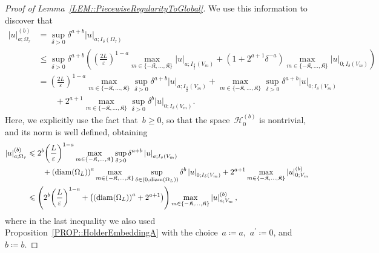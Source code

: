 \documentclass[12pt,a4paper]{amsart}
\makeatletter
\numberwithin{equation}{section}
\theoremstyle{definition}
\theoremstyle{remark}
\newcommand{\eps}{\varepsilon}
\newcommand{\abs}[1]{\left\lvert#1\right\rvert}
\renewcommand{\leq}{\leqslant}
\renewcommand{\geq}{\geqslant}
\newcommand{\constapp}[1]{%
  \csname constapp@#1\endcsname%
}
\makeatother
\begin{document}
\begin{appendix}
\begin{proof}[Proof of Lemma~\ref{LEM::PiecewiseRegularityToGlobal}]
    We use this information to discover that
    \begin{equation}
        \begin{split}
            \abs{u}_{a; \Omega_\tau}^{(b)} &= \sup_{\delta > 0}\delta^{a+b} \abs{u}_{a; I_\delta(\Omega_\tau)}\\
                &\leq \sup_{\delta > 0}\delta^{a+b}\left({\left(\frac{2L}{\eps}\right)}^{1-a}\max_{m \in \{-\mathfrak{K},\dots,\mathfrak{K}\}} \abs{u}_{a; I_{\frac{\delta}{2}}(V_m)} + (1+2^{a+1}{\delta^{-a}})\max_{m \in \{-\mathfrak{K},\dots,\mathfrak{K}\}}\abs{u}_{0;I_\delta(V_m)}\right)\\
                &= {\left(\frac{2L}{\eps}\right)}^{1-a}\max_{m \in \{-\mathfrak{K},\dots,\mathfrak{K}\}}\sup_{\delta > 0}\delta^{a+b}\abs{u}_{a; I_{\frac{\delta}{2}}(V_m)} +\max_{m \in \{-\mathfrak{K},\dots,\mathfrak{K}\}} \sup_{\delta > 0}\delta^{a+b}\abs{u}_{0;I_\delta(V_m)}\\
                &\qquad + 2^{a+1}\max_{m \in \{-\mathfrak{K},\dots,\mathfrak{K}\}} \sup_{\delta > 0}\delta^{b}\abs{u}_{0;I_\delta(V_m)}.
        \end{split}
    \end{equation}
    Here, we explicitly use the fact that~$b \geq 0$, so that the space~$\mathcal{H}_0^{(b)}$ is nontrivial, and its norm is well defined, obtaining
    \begin{equation}\label{EQ::PiecewiseRegularityToGlobalLongComputation}
        \begin{split}
                \abs{u}_{a; \Omega_\tau}^{(b)}&\leq 2^{b}{\left(\frac{L}{\eps}\right)}^{1-a}\max_{m \in \{-\mathfrak{K},\dots,\mathfrak{K}\}}\sup_{\delta > 0}\delta^{a+b}\abs{u}_{a; I_\delta(V_m)}\\
                &\qquad + {\left(\operatorname{diam}(\Omega_L)\right)}^a\max_{m \in \{-\mathfrak{K},\dots,\mathfrak{K}\}} \sup_{\delta \in (0,\operatorname{diam}(\Omega_L))}\delta^{b}\abs{u}_{0;I_\delta(V_m)}+2^{a+1}\max_{m \in \{-\mathfrak{K},\dots,\mathfrak{K}\}} \abs{u}_{0;V_m}^{(b)}\\
                &\leq \left(2^{b}{\left(\frac{L}{\eps}\right)}^{1-a} + \constapp{CONST::HolderEmbeddingA}\left({\left(\operatorname{diam}(\Omega_L)\right)}^a + 2^{a+1}\right)\right)\max_{m \in \{-\mathfrak{K},\dots,\mathfrak{K}\}} \abs{u}_{a;V_m}^{(b)},
        \end{split}
    \end{equation}
    where in the last inequality we also used Proposition~\ref{PROP::HolderEmbeddingA} with the choice~$a \coloneq a$,~$a^\prime \coloneq 0$, and~$b \coloneq b$.


\end{proof}
\end{appendix}
\end{document}
